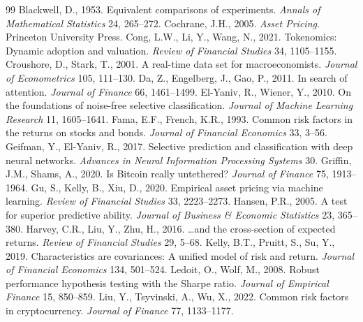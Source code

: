\documentclass[12pt]{article}
\begin{document}
\begin{thebibliography}{99}
 Blackwell, D., 1953. Equivalent comparisons of experiments. \textit{Annals of Mathematical Statistics} 24, 265--272.
 Cochrane, J.H., 2005. \textit{Asset Pricing}. Princeton University Press.
 Cong, L.W., Li, Y., Wang, N., 2021. Tokenomics: Dynamic adoption and valuation. \textit{Review of Financial Studies} 34, 1105--1155.
 Croushore, D., Stark, T., 2001. A real-time data set for macroeconomists. \textit{Journal of Econometrics} 105, 111--130.
 Da, Z., Engelberg, J., Gao, P., 2011. In search of attention. \textit{Journal of Finance} 66, 1461--1499.
 El-Yaniv, R., Wiener, Y., 2010. On the foundations of noise-free selective classification. \textit{Journal of Machine Learning Research} 11, 1605--1641.
 Fama, E.F., French, K.R., 1993. Common risk factors in the returns on stocks and bonds. \textit{Journal of Financial Economics} 33, 3--56.
 Geifman, Y., El-Yaniv, R., 2017. Selective prediction and classification with deep neural networks. \textit{Advances in Neural Information Processing Systems} 30.
 Griffin, J.M., Shams, A., 2020. Is Bitcoin really untethered? \textit{Journal of Finance} 75, 1913--1964.
 Gu, S., Kelly, B., Xiu, D., 2020. Empirical asset pricing via machine learning. \textit{Review of Financial Studies} 33, 2223--2273.
 Hansen, P.R., 2005. A test for superior predictive ability. \textit{Journal of Business \& Economic Statistics} 23, 365--380.
 Harvey, C.R., Liu, Y., Zhu, H., 2016. \ldots and the cross-section of expected returns. \textit{Review of Financial Studies} 29, 5--68.
 Kelly, B.T., Pruitt, S., Su, Y., 2019. Characteristics are covariances: A unified model of risk and return. \textit{Journal of Financial Economics} 134, 501--524.
 Ledoit, O., Wolf, M., 2008. Robust performance hypothesis testing with the Sharpe ratio. \textit{Journal of Empirical Finance} 15, 850--859.
 Liu, Y., Tsyvinski, A., Wu, X., 2022. Common risk factors in cryptocurrency. \textit{Journal of Finance} 77, 1133--1177.

\end{thebibliography}
\end{document}
